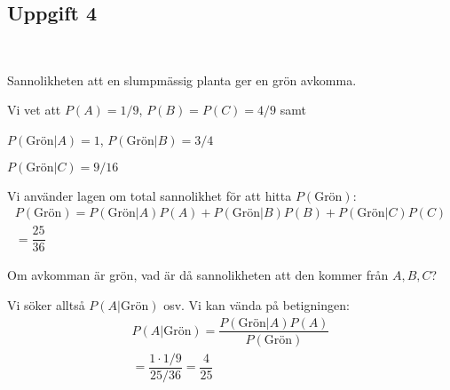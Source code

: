\subsection{Uppgift 4}\hfill\\\par
\noindent Sannolikheten att en slumpmässig planta ger en grön avkomma.\par
\noindent Vi vet att $P(A) = 1/9$, $P(B)=P(C) = 4/9$ samt\par
\noindent $P(\text{Grön}|A) = 1$, $P(\text{Grön}|B) = 3/4$\par
\noindent  $P(\text{Grön}|C) = 9/16$\par
\noindent Vi använder lagen om total sannolikhet för att hitta $P(\text{Grön})$:
\begin{equation*}
  \begin{gathered}
    P(\text{Grön}) = P(\text{Grön}|A)P(A) + P(\text{Grön}|B)P(B)+ P(\text{Grön}|C)P(C)\\
    = \dfrac{25}{36}
  \end{gathered}
\end{equation*}
\par\bigskip
\noindent Om avkomman är grön, vad är då sannolikheten att den kommer från $A,B,C$?\par
\noindent Vi söker alltså $P(A|\text{Grön})$ osv. Vi kan vända på betigningen:
\begin{equation*}
  \begin{gathered}
    P(A|\text{Grön}) = \dfrac{P(\text{Grön}|A)P(A)}{P(\text{Grön})}\\
    = \dfrac{1\cdot1/9}{25/36} = \dfrac{4}{25}
  \end{gathered}
\end{equation*}
\par\bigskip
